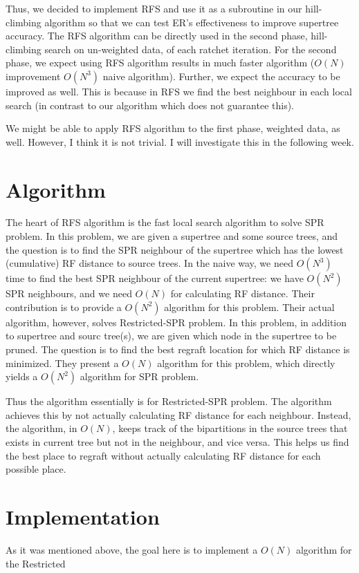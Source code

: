 \documentclass[12pt]{article}
\begin{document}
Thus, we decided to implement RFS and use it as a subroutine in our hill-climbing algorithm so that we can test ER's effectiveness to improve supertree accuracy. The  RFS algorithm can be directly used in the second phase, hill-climbing search on un-weighted data, of each ratchet iteration. For the second phase, we expect using RFS algorithm results in much faster algorithm ($O(N)$ improvement $O(N^3)$ naive algorithm). Further, we expect the accuracy to be improved as well. This is because  in RFS we find the best neighbour in each local search (in contrast to our algorithm which does not guarantee this). 

We might be able to apply RFS algorithm to the first phase, weighted data, as well. However, I think it is not trivial. I will investigate this in the following week.



\section{Algorithm}
The heart of RFS algorithm is the fast local search algorithm to solve SPR problem. In this problem, we are given a supertree and some source trees, and the question is to find the SPR neighbour of the supertree which has the lowest (cumulative) RF distance to source trees. In the naive way, we need $O(N^3)$ time to find the best SPR neighbour of the current supertree: we have $O(N^2)$ SPR neighbours, and we need $O(N)$ for calculating RF distance. Their contribution is to provide a $O(N^2)$ algorithm for this problem. Their actual algorithm, however, solves Restricted-SPR problem. In this problem, in addition to supertree and sourc tree(s), we are given which node in the supertree to be pruned. The question is to find the best regraft location for which RF distance is minimized. They present a $O(N)$ algorithm for this problem, which directly yields a $O(N^2)$ algorithm for SPR  problem.

Thus the algorithm essentially is for Restricted-SPR problem. The algorithm achieves this by not actually calculating RF distance for each neighbour. Instead, the algorithm, in $O(N)$, keeps track of the bipartitions in the source trees that exists in current tree but not in the neighbour, and vice versa. This helps us find the best place to regraft without actually calculating RF distance for each possible place.

\section{Implementation}     
As it was mentioned above, the goal here is to implement a $O(N)$ algorithm for the Restricted
\end{document}
